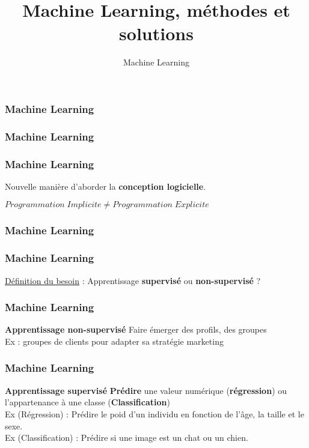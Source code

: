 \documentclass{formation}
\title{Machine Learning, méthodes et solutions}
\subtitle{Machine Learning}
\begin{document}
\maketitle

\begin{frame}
  \frametitle{Machine Learning}
\end{frame}

\begin{frame}
  \frametitle{Machine Learning}
\end{frame}

\begin{frame}
  \frametitle{Machine Learning}
  \begin{center}
  Nouvelle manière d'aborder la \textbf{conception logicielle}.
  \end{center}
  \begin{center}
  $\boxed{Programmation\;Implicite \neq Programmation\;Explicite}$
  \end{center}
\end{frame}

\begin{frame}
  \frametitle{Machine Learning}
\end{frame}

\begin{frame}
  \frametitle{Machine Learning}
  \underline{Définition du besoin} :
  \newline
  \newline
  Apprentissage \textbf{supervisé} ou \textbf{non-supervisé} ?
\end{frame}

\begin{frame}
  \frametitle{Machine Learning}
  \textbf{Apprentissage non-supervisé}
  \newline \newline
  Faire émerger des profils, des groupes \\
  \newline
  Ex : groupes de clients pour adapter sa stratégie marketing \\
\end{frame}

\begin{frame}
  \frametitle{Machine Learning}
  \textbf{Apprentissage supervisé}
  \newline \newline
  \textbf{Prédire} une valeur numérique (\textbf{régression}) ou l'appartenance à une classe (\textbf{Classification}) \\
  \newline
  Ex (Régression)     : Prédire le poid d'un individu en fonction de l'âge, la taille et le sexe. \\
  Ex (Classification) : Prédire si une image est un chat ou un chien. \\
\end{frame}
\end{document}
